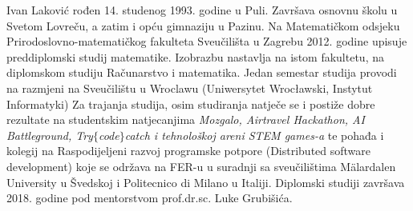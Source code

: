 \documentclass[a4paper,twoside,12pt]{memoir} %
\begin{document}

\begin{cv}
Ivan Laković rođen 14. studenog 1993. godine u Puli. Završava osnovnu školu u Svetom Lovreču, a zatim i opću gimnaziju u Pazinu. Na Matematičkom odsjeku Prirodoslovno-matematičkog fakulteta Sveučilišta u Zagrebu 2012. godine upisuje preddiplomski studij matematike. Izobrazbu nastavlja na istom fakultetu, na diplomskom studiju Računarstvo i matematika. Jedan semestar studija provodi na razmjeni na Sveučilištu u Wroclawu (Uniwersytet Wrocławski, Instytut Informatyki) Za trajanja studija, osim studiranja natječe se i postiže dobre rezultate na studentskim natjecanjima \textit{Mozgalo, Airtravel Hackathon, AI Battleground, Try$\{$code$\}$catch i tehnološkoj areni STEM games-a} te pohađa i kolegij na Raspodijeljeni razvoj programske potpore (Distributed software development) koje se održava na FER-u u suradnji sa sveučilištima Mälardalen University u Švedskoj i Politecnico di Milano u Italiji. Diplomski studiji završava 2018. godine pod mentorstvom prof.dr.sc. Luke Grubišića.
\end{cv}
\end{document}
